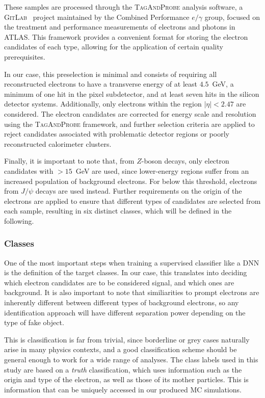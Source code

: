 These samples are processed through the \textsc{TagAndProbe} analysis software, a \textsc{GitLab}~\cite{tagandprobe} project maintained by the Combined Performance $e/\gamma$ group, focused on the treatment and performance measurements of electrons and photons in ATLAS. This framework provides a convenient format for storing the electron candidates of each type, allowing for the application of certain quality prerequisites.

In our case, this preselection is minimal and consists of requiring all reconstructed electrons to have a transverse energy of at least $4.5$~GeV, a minimum of one hit in the pixel subdetector, and at least seven hits in the silicon detector systems. Additionally, only electrons within the region $|\eta| < 2.47$ are considered. The electron candidates are corrected for energy scale and resolution using the \textsc{TagAndProbe} framework, and further selection criteria are applied to reject candidates associated with problematic detector regions or poorly reconstructed calorimeter clusters.

Finally, it is important to note that, from $Z$-boson decays, only electron candidates with \et$>15$~GeV are used, since lower-energy regions suffer from an increased population of background electrons. For \et below this threshold, electrons from $J/\psi$ decays are used instead. Further requirements on the origin of the electrons are applied to ensure that different types of candidates are selected from each sample, resulting in six distinct classes, which will be defined in the following.

\subsubsection{Classes}

One of the most important steps when training a supervised classifier like a DNN is the definition of the target classes. In our case, this translates into deciding which electron candidates are to be considered signal, and which ones are background. It is also important to note that similiarities to prompt electrons are inherently different between different types of background electrons, so any identification approach will have different separation power depending on the type of fake object. 

This is classification is far from trivial, since borderline or grey cases naturally arise in many physics contexts, and a good classification scheme should be general enough to work for a wide range of analyses.
The class labels used in this study are based on a \textit{truth} classification, which uses information such as the origin and type of the electron, as well as those of its mother particles. This is information that can be uniquely accessed in our produced MC simulations.

